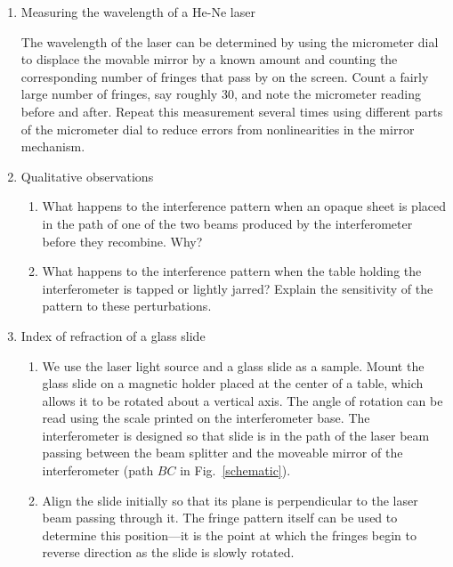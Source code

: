 \documentclass{tufte-handout}
\begin{document}
\begin{enumerate}
\item \label{proc:lambda} Measuring the wavelength of a He-Ne laser

The wavelength of the laser can be determined by using the micrometer
dial to displace the movable mirror by a known amount and counting
the corresponding number of fringes that pass by on the screen.
Count a fairly large number of fringes, say roughly 30, and note the
micrometer reading before and after.  Repeat this measurement several
times using different parts of the micrometer dial to reduce errors from
nonlinearities in the mirror mechanism.

\item Qualitative observations

\begin{enumerate}
\item What happens to the interference pattern when an opaque sheet 
is placed in the path of one of the two beams produced by the 
interferometer before they recombine. Why?

\item What happens to the interference pattern when the table holding 
the interferometer is tapped or lightly jarred? Explain the sensitivity 
of the pattern to these perturbations.
\end{enumerate}

\item Index of refraction of a glass slide 

\begin{enumerate}
\item We use the laser light source and a glass slide as a sample.
Mount the glass slide on a magnetic holder placed at the center of a
table, which allows it to be rotated about a vertical axis.  The angle of
rotation can be read using the scale printed on the interferometer base.
The interferometer is designed so that slide is in the path of the laser
beam passing between the beam splitter and the moveable mirror of the
interferometer (path $BC$ in Fig.~\ref{schematic}).

\item Align the slide initially so that its plane is perpendicular to the laser
  beam passing through it. The fringe pattern itself can be used to determine
  this position---it is the point at which the fringes begin to reverse
  direction as the slide is slowly rotated.


\end{enumerate}
\end{enumerate}
\end{document}
